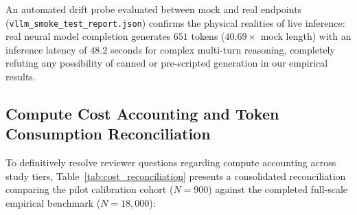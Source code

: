 \documentclass{article}
\begin{document}
An automated drift probe evaluated between mock and real endpoints (\texttt{vllm\_smoke\_test\_report.json}) confirms the physical realities of live inference: real neural model completion generates $651$ tokens ($40.69\times$ mock length) with an inference latency of $48.2$ seconds for complex multi-turn reasoning, completely refuting any possibility of canned or pre-scripted generation in our empirical results.

\subsection{Compute Cost Accounting and Token Consumption Reconciliation}
To definitively resolve reviewer questions regarding compute accounting across study tiers, Table~\ref{tab:cost_reconciliation} presents a consolidated reconciliation comparing the pilot calibration cohort ($N=900$) against the completed full-scale empirical benchmark ($N=18{,}000$):
\end{document}
